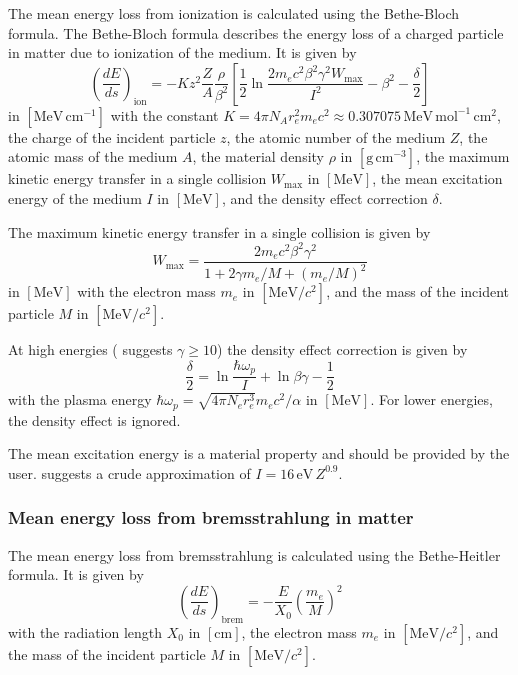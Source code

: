 The mean energy loss from ionization is calculated using the Bethe-Bloch formula. The Bethe-Bloch formula describes the energy loss of a charged particle in matter due to ionization of the medium. It is given by \cite{pdg2024}
\begin{equation}
    \left( \frac{dE}{ds} \right)_{\text{ion}} = - K z^2 \frac{Z}{A} \frac{\rho}{\beta^2} \left[ \frac{1}{2} \ln \frac{2m_e c^2 \beta^2 \gamma^2 W_{\text{max}}}{I^2} - \beta^2 - \frac{\delta}{2} \right]
\end{equation}
in $[\text{MeV} \, \text{cm}^{-1}]$ with the constant $K = 4 \pi N_A r_e^2 m_e c^2 \approx 0.307075 \, \text{MeV} \, \text{mol}^{-1} \, \text{cm}^2$, the charge of the incident particle $z$, the atomic number of the medium $Z$, the atomic mass of the medium $A$, the material density $\rho$ in $[\text{g} \, \text{cm}^{-3}]$, the maximum kinetic energy transfer in a single collision $W_{\text{max}}$ in $[\text{MeV}]$, the mean excitation energy of the medium $I$ in $[\text{MeV}]$, and the density effect correction $\delta$.

The maximum kinetic energy transfer in a single collision is given by \cite{pdg2024}
\begin{equation}
    W_{\text{max}} = \frac{2 m_e c^2 \beta^2 \gamma^2}{1 + 2 \gamma m_e / M + (m_e / M)^2}
\end{equation}
in $[\text{MeV}]$ with the electron mass $m_e$ in $[\text{MeV}/c^2]$, and the mass of the incident particle $M$ in $[\text{MeV}/c^2]$.

At high energies (\textcite{pub-2008-003} suggests $\gamma \ge 10$) the density effect correction is given by \cite{pdg2024}
\begin{equation}
    \frac{\delta}{2} = \ln \frac{\hbar \omega_p}{I} + \ln \beta \gamma - \frac{1}{2}
\end{equation}
with the plasma energy $\hbar \omega_p = \sqrt{4 \pi N_e r_e^3} m_e c^2 / \alpha$ in $[\text{MeV}]$. For lower energies, the density effect is ignored.

The mean excitation energy is a material property and should be provided by the user. \textcite{pub-2008-003} suggests a crude approximation of $I = 16 \, \text{eV} \, Z^{0.9}$.

\subsubsection{Mean energy loss from bremsstrahlung in matter}

The mean energy loss from bremsstrahlung is calculated using the Bethe-Heitler formula. It is given by \cite{bethe-heitler}
\begin{equation}
    \left( \frac{dE}{ds} \right)_{\text{brem}} = - \frac{E}{X_0} \left( \frac{m_e}{M} \right)^2
\end{equation}
with the radiation length $X_0$ in $[\text{cm}]$, the electron mass $m_e$ in $[\text{MeV}/c^2]$, and the mass of the incident particle $M$ in $[\text{MeV}/c^2]$.

